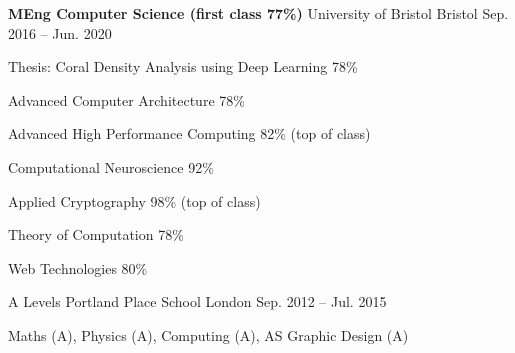 \vspace{-1.1em}


\vspace{-0.2em}

\begin{cventries}

  \cventry
    {\textbf{MEng Computer Science (first class 77\%)}} %
    {University of Bristol} %
    {Bristol} %
    {Sep. 2016 -- Jun. 2020} %
    {
      \begin{cvitems} %
        \item {Thesis: Coral Density Analysis using Deep Learning 78\%}
        \item {Advanced Computer Architecture 78\%}
        \item {Advanced High Performance Computing 82\% (top of class)}
        \item {Computational Neuroscience 92\%}
        \item {Applied Cryptography 98\% (top of class)}
        \item {Theory of Computation 78\%}
        \item {Web Technologies 80\%}
      \end{cvitems}
    }
    
  \cventry
    {A Levels} %
    {Portland Place School} %
    {London} %
    {Sep. 2012 -- Jul. 2015} %
    {
      \begin{cvitems} %
        \item {Maths (A), Physics (A), Computing (A), AS Graphic Design (A)}
      \end{cvitems}
    }
\end{cventries}
